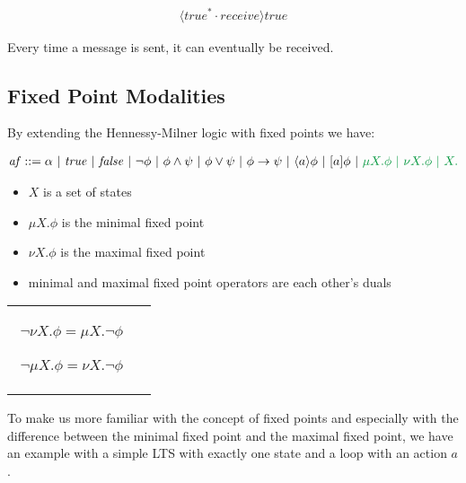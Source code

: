 \documentclass{clseminar}
\begin{document}
  \begin{align*}
    [\mathit{true}^*\cdot \mathit{send}]\langle \mathit{true}^* \cdot \mathit{receive} \rangle \mathit{true}
  \end{align*}

  Every time a message is sent, it can eventually be received.

  \subsection{Fixed Point Modalities}

  By extending the Hennessy-Milner logic with fixed points we have:

  \begin{align*}
    \mathit{af} ::= \alpha\ |\ \mathit{true}\ |\ \mathit{false}\ |\ \neg \phi\ |\ \phi \land \psi\ |\ \phi \lor \psi\ |\ \phi \to \psi\ |\ \langle a \rangle \phi \ |\ [a]\phi\ |\ \color{green} \mu X. \phi \ |\ \nu X. \phi \ |\ X.
  \end{align*}

  \begin{itemize}
    \item $X$ is a set of states
    \item $\mu X. \phi$ is the minimal fixed point
    \item $\nu X. \phi$ is the maximal fixed point
    \item minimal and maximal fixed point operators are each other's duals
  \end{itemize}
  \begin{tabular}{cc}
    \begin{minipage}{.47\linewidth}
      \begin{align*}
        \neg \nu X. \phi = \mu X. \neg \phi
      \end{align*}
    \end{minipage}
    \begin{minipage}{.47\linewidth}
      \begin{align*}
        \neg \mu X. \phi = \nu X. \neg \phi
      \end{align*}
    \end{minipage}
  \end{tabular}

  To make us more familiar with the concept of fixed points and especially with the difference between the minimal fixed point and the maximal fixed point, we have an example with a simple LTS with exactly one state and a loop with an action $a$. \\
\end{document}
